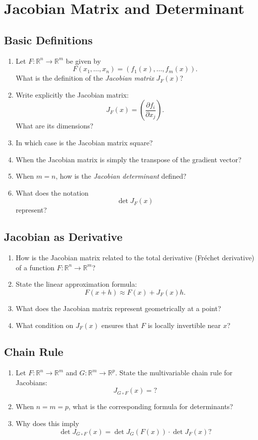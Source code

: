 \section{Jacobian Matrix and Determinant}

\subsection{Basic Definitions}
\begin{enumerate}
  \item Let $F : \mathbb{R}^n \to \mathbb{R}^m$ be given by
    \[
      F(x_1,\dots,x_n) = (f_1(x),\dots,f_m(x)).
    \]
    What is the definition of the \emph{Jacobian matrix} $J_F(x)$?
  \item Write explicitly the Jacobian matrix:
    \[
      J_F(x) = \left( \frac{\partial f_i}{\partial x_j} \right).
    \]
    What are its dimensions?
  \item In which case is the Jacobian matrix square?
  \item When the Jacobian matrix is simply the transpose of the gradient vector?
  \item When $m = n$, how is the \emph{Jacobian determinant} defined?
  \item What does the notation
    \[
      \det J_F(x)
    \]
    represent?
\end{enumerate}

\subsection{Jacobian as Derivative}
\begin{enumerate}[resume]
  \item How is the Jacobian matrix related to the total derivative (Fréchet derivative) of a function $F : \mathbb{R}^n \to \mathbb{R}^m$?
  \item State the linear approximation formula:
    \[
      F(x+h) \approx F(x) + J_F(x)h.
    \]
  \item What does the Jacobian matrix represent geometrically at a point?
  \item What condition on $J_F(x)$ ensures that $F$ is locally invertible near $x$?
\end{enumerate}

\subsection{Chain Rule}
\begin{enumerate}[resume]
  \item Let $F : \mathbb{R}^n \to \mathbb{R}^m$ and $G : \mathbb{R}^m \to \mathbb{R}^p$.
    State the multivariable chain rule for Jacobians:
    \[
      J_{G \circ F}(x) = ?
    \]
  \item When $n=m=p$, what is the corresponding formula for determinants?
  \item Why does this imply
    \[
      \det J_{G \circ F}(x)
      =
      \det J_G(F(x)) \cdot \det J_F(x)?
    \]
\end{enumerate}


